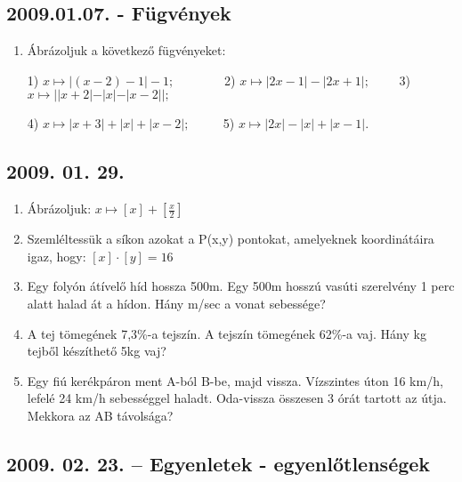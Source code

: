 \subsection*{2009.01.07. - Fügvények}
\begin{enumerate}
\item Ábrázoljuk a következő fügvényeket:

1) $x\mapsto |(x-2)-1|-1;$ $\qquad\ \ \ \ \ \ $ 2) $x\mapsto |2x-1|-|2x+1|;$ $\qquad$3) $x\mapsto ||x+2|-|x|-|x-2||;$

4) $x\mapsto |x+3|+|x|+|x-2|;$ $\qquad\!$ 5) $x\mapsto |2x|-|x|+|x-1|.$ 
\end{enumerate}
\subsection*{2009. 01. 29.}
 
\begin{enumerate}
 
\item Ábrázoljuk: $x \mapsto [x]+[\displaystyle{\frac{x}{2}}]$
 
\item Szemléltessük a síkon azokat a P(x,y) pontokat, amelyeknek koordinátáira igaz, hogy: $[x]\cdot [y]=16$
 
\item Egy folyón átívelő híd hossza 500m. Egy 500m hosszú vasúti szerelvény 1 perc alatt halad át a hídon. Hány m/sec a vonat sebessége?
 
\item A tej tömegének 7,3\%-a tejszín. A tejszín tömegének 62\%-a vaj. Hány kg tejből készíthető 5kg vaj?
 
\item Egy fiú kerékpáron ment A-ból B-be, majd vissza. Vízszintes úton 16 km/h, lefelé 24 km/h sebességgel haladt. Oda-vissza összesen 3 órát tartott az útja. Mekkora az AB távolsága?
 
\end{enumerate}
 
\subsection*{2009. 02. 23. -- Egyenletek - egyenlőtlenségek}
 
